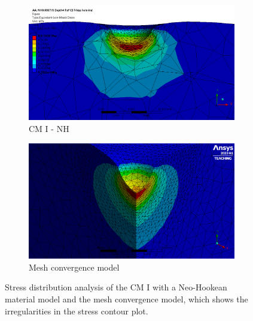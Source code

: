 \begin{figure}
    \centering
    \begin{subfigure}[b]{0.45\textwidth}
    \centering
    \includegraphics[width=\textwidth]{Images/computational/37CSNHstresshalfzoommesh.png}
    \caption{CM I - NH}
    \label{fig:cm1meshtotal}
    \end{subfigure}
    \hfill
    \begin{subfigure}[b]{0.45\textwidth}
    \centering
    \includegraphics[width=\textwidth]{Images/computational/meshzoomstress.png}
    \caption{Mesh convergence model}
    \label{fig:cm1meshref}
    \end{subfigure}
    \hspace{0.3cm}
    \caption[Mesh convergence model I stress distribution]{Stress distribution analysis of the CM I with a Neo-Hookean material model and the mesh convergence model, which shows the irregularities in the stress contour plot.}
    \label{fig:stressdistributionanalysis}
\end{figure}
